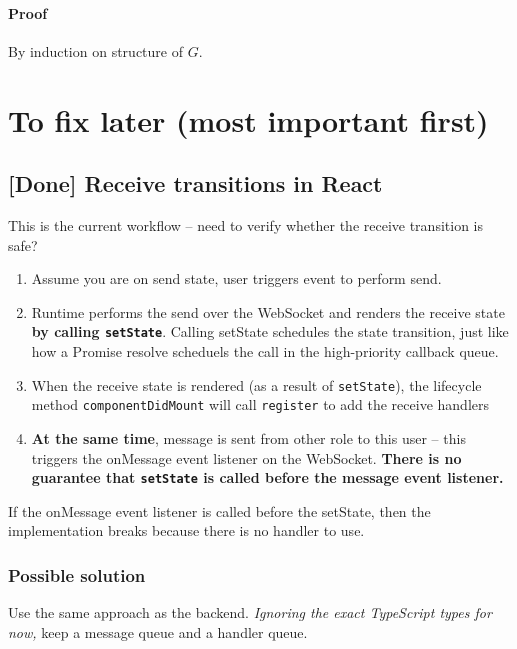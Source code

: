 \documentclass{article}
\begin{document}
\paragraph{Proof}
By induction on structure of $G$.

\newpage

\section{To fix later (most important first)}

\subsection*{[Done] Receive transitions in React}
This is the current workflow -- need to verify whether the receive transition is safe?

\begin{enumerate}
\item
Assume you are on send state, user triggers
event to perform send.
\item
Runtime performs the send over the WebSocket
and renders the receive state \textbf{by
calling \texttt{setState}}. Calling setState 
schedules the state transition, just like
how a Promise resolve scheduels the call in
the high-priority callback queue.

\item When the receive state is rendered (as a 
result of \texttt{setState}), the lifecycle
method \texttt{componentDidMount} will call \texttt{register} to add the receive handlers 

\item \textbf{At the same time}, message is sent from
other role to this user -- this triggers the 
onMessage event listener on the WebSocket. 
\textbf{There is no guarantee that \texttt{setState} 
is called before the message event listener.}

\end{enumerate}

If the onMessage event listener
is called before the setState,
then the implementation breaks because there is no
handler to use.

\subsubsection*{Possible solution}

Use the same approach as the backend.
\textit{Ignoring the exact TypeScript types for now,}
keep a message queue and a handler queue.
\end{document}
